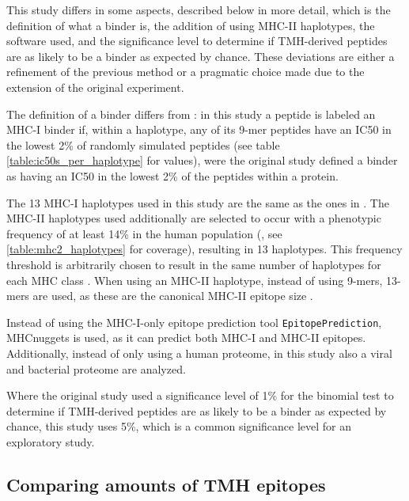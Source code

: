 This study differs in some aspects, described below in more detail,
which is the definition of what a binder is,
the addition of using MHC-II haplotypes, the software used,
and the significance level to determine if TMH-derived peptides are as 
likely to be a binder as expected by chance.
These deviations are either a refinement of the previous method or
a pragmatic choice made due to the extension of the original experiment.

The definition of a binder differs from \cite{bianchi2017}:
in this study a peptide is labeled an MHC-I binder if, within a haplotype, 
any of its 9-mer peptides have an IC50 in the lowest 2\% of randomly simulated 
peptides (see table \ref{table:ic50s_per_haplotype} for values), were the original study defined
a binder as having an IC50 in the lowest 2\% of the peptides within a protein.

The 13 MHC-I haplotypes used in this study are the same as 
the ones in \cite{bianchi2017}.
The MHC-II haplotypes used additionally are selected 
to occur with a phenotypic frequency of at least 14\% in
the human population (\cite{greenbaum2011functional},
see \ref{table:mhc2_haplotypes} for coverage),
resulting in 13 haplotypes.
This frequency threshold is arbitrarily chosen to result in 
the same number of haplotypes for each MHC class
.
When using an MHC-II haplotype, instead of using 9-mers, 13-mers are
used, as these are the canonical MHC-II epitope size .

Instead of using the MHC-I-only epitope prediction 
tool \verb;EpitopePrediction;, MHCnuggets is used, as it can predict
both MHC-I and MHC-II epitopes.
Additionally, instead of only using a human proteome, in this study
also a viral and bacterial proteome are analyzed.

Where the original study used a significance level of 1\% 
for the binomial test to determine if TMH-derived peptides 
are as likely to be a binder as expected by chance, this study
uses 5\%, which is a common significance level for an exploratory study.

\subsection{Comparing amounts of TMH epitopes}

